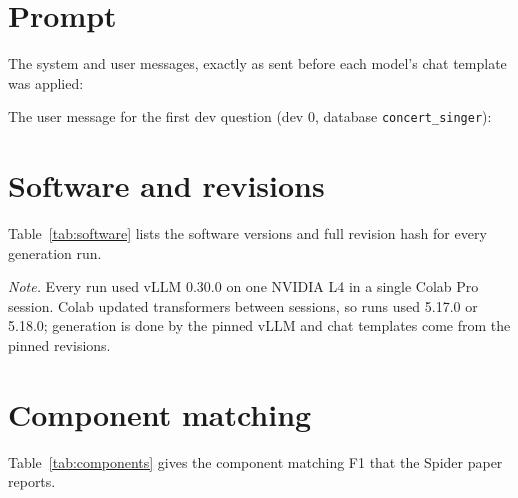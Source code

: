 \documentclass[11pt]{article}
\begin{document}
\clearpage
\appendix

\section{Prompt}
\label{app:prompt}
The system and user messages, exactly as sent before each model's chat template was applied:


The user message for the first dev question (dev 0, database \texttt{concert\_singer}):


\section{Software and revisions}
\label{app:software}
Table~\ref{tab:software} lists the software versions and full revision hash for every generation run.
\begin{table}[htbp]
\centering
\caption{Software versions and full Hugging Face revision for every generation run.}
\label{tab:software}
\scriptsize
\setlength{\tabcolsep}{3pt}
\resizebox{\linewidth}{!}{}

\vspace{2pt}
\begin{minipage}{\linewidth}\scriptsize
\textit{Note.} Every run used vLLM 0.30.0 on one NVIDIA L4 in a single Colab Pro session. Colab updated transformers between sessions, so runs used 5.17.0 or 5.18.0; generation is done by the pinned vLLM and chat templates come from the pinned revisions.
\end{minipage}
\end{table}

\section{Component matching}
\label{app:components}
Table~\ref{tab:components} gives the component matching F1 that the Spider paper reports.
\begin{table}[htbp]
\centering
\caption{Component matching F1 (\%) over all questions, as reported by the Spider evaluation script.}
\label{tab:components}
\scriptsize
\setlength{\tabcolsep}{3pt}

\end{table}
\end{document}
